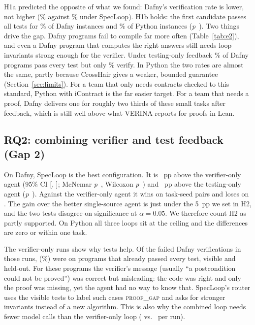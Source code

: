 H1a predicted the opposite of what we found: Dafny's verification rate is lower, not higher (\% against \% under SpecLoop). H1b holds: the first candidate passes all tests for \% of Dafny instances and \% of Python instances (\emph{p}~). Two things drive the gap. Dafny programs fail to compile far more often (Table~\ref{tab:e2}), and even a Dafny program that computes the right answers still needs loop invariants strong enough for the verifier. Under testing-only feedback \% of Dafny programs pass every test but only \% verify. In Python the two rates are almost the same, partly because CrossHair gives a weaker, bounded guarantee (Section~\ref{sec:limits}). For a team that only needs contracts checked to this standard, Python with iContract is the far easier target. For a team that needs a proof, Dafny delivers one for roughly two thirds of these small tasks after feedback, which is still well above what VERINA reports for proofs in Lean.

\subsection{RQ2: combining verifier and test feedback (Gap 2)}
On Dafny, SpecLoop is the best configuration. It is ~pp above the verifier-only agent (95\% CI [, ]; McNemar \emph{p}~, Wilcoxon \emph{p}~) and ~pp above the testing-only agent (\emph{p}~). Against the verifier-only agent it wins on  task-seed pairs and loses on . The gain over the better single-source agent is just under the 5~pp we set in H2, and the two tests disagree on significance at $\alpha = 0.05$. We therefore count H2 as partly supported. On Python all three loops sit at the ceiling and the differences are zero or within one task.

The verifier-only runs show why tests help. Of the  failed Dafny verifications in those runs,  (\%) were on programs that already passed every test, visible and held-out. For these programs the verifier's message (usually ``a postcondition could not be proved'') was correct but misleading: the code was right and only the proof was missing, yet the agent had no way to know that. SpecLoop's router uses the visible tests to label such cases \textsc{proof\_gap} and asks for stronger invariants instead of a new algorithm. This is also why the combined loop needs fewer model calls than the verifier-only loop ( vs.\  per run).


